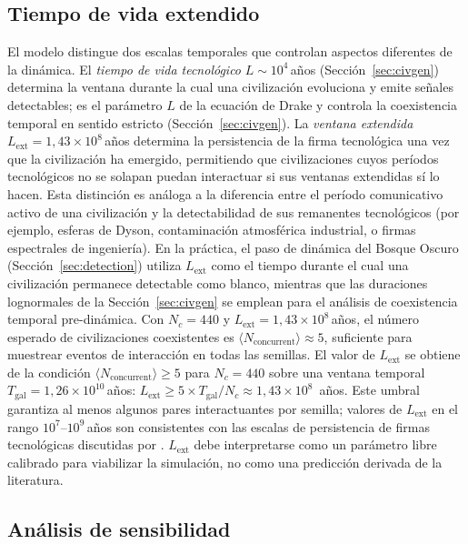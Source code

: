 \documentclass[useAMS,usenatbib,onecolumn]{mn2e}
\begin{document}
\subsection{Tiempo de vida extendido}
\label{sec:lifetime}

El modelo distingue dos escalas temporales que controlan aspectos
diferentes de la dinámica.
El \emph{tiempo de vida tecnológico} $L \sim 10^4$\,años
(Sección~\ref{sec:civgen}) determina la ventana durante la cual una
civilización evoluciona y emite señales detectables; es el parámetro $L$
de la ecuación de Drake y controla la coexistencia temporal en sentido
estricto (Sección~\ref{sec:civgen}).
La \emph{ventana extendida} $L_\text{ext} = 1{,}43\times10^8$\,años
\citep{sandberg2018} determina la persistencia de la firma tecnológica
una vez que la civilización ha emergido, permitiendo que civilizaciones
cuyos períodos tecnológicos no se solapan puedan interactuar si sus
ventanas extendidas sí lo hacen.
Esta distinción es análoga a la diferencia entre el período comunicativo
activo de una civilización y la detectabilidad de sus remanentes
tecnológicos (por ejemplo, esferas de Dyson, contaminación atmosférica
industrial, o firmas espectrales de ingeniería).
En la práctica, el paso de dinámica del Bosque Oscuro
(Sección~\ref{sec:detection}) utiliza $L_\text{ext}$ como el tiempo
durante el cual una civilización permanece detectable como blanco,
mientras que las duraciones lognormales de la Sección~\ref{sec:civgen}
se emplean para el análisis de coexistencia temporal pre-dinámica.
Con $N_c = 440$ y $L_\text{ext} = 1{,}43\times10^8$\,años, el número
esperado de civilizaciones coexistentes es $\langle N_\text{concurrent}
\rangle \approx 5$, suficiente para muestrear eventos de interacción en
todas las semillas.
El valor de $L_\text{ext}$ se obtiene de la condición
$\langle N_\text{concurrent} \rangle \geq 5$ para $N_c = 440$ sobre una
ventana temporal $T_\text{gal} = 1{,}26\times10^{10}$\,años:
$L_\text{ext} \geq 5 \times T_\text{gal} / N_c \approx 1{,}43\times10^8$
\,años.
Este umbral garantiza al menos algunos pares interactuantes por semilla;
valores de $L_\text{ext}$ en el rango $10^7$--$10^9$\,años son
consistentes con las escalas de persistencia de firmas tecnológicas
discutidas por \citet{sandberg2018}.
$L_\text{ext}$ debe interpretarse como un parámetro libre calibrado
para viabilizar la simulación, no como una predicción derivada de la
literatura.

\subsection{Análisis de sensibilidad}
\label{sec:sensibilidad}
\end{document}
